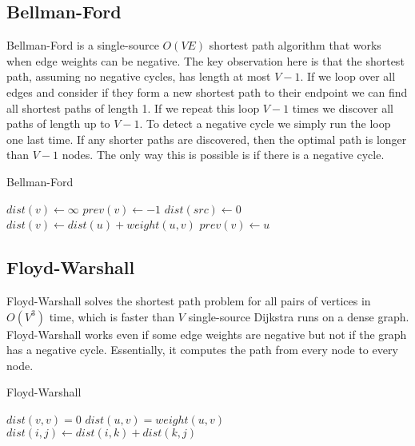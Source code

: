 \documentclass{article}
\begin{document}
\subsection{Bellman-Ford}

Bellman-Ford is a single-source $O(VE)$ shortest path algorithm that works when edge weights can be negative. The key observation here is that the shortest path, assuming no negative cycles, has length at most $V-1$.  If we loop over all edges and consider if they form a new shortest path to their endpoint we can find all shortest paths of length 1.  If we repeat this loop $V-1$ times we discover all paths of length up to $V-1$. To detect a negative cycle we simply run the loop one last time.  If any shorter paths are discovered, then the optimal path is longer than $V-1$ nodes.  The only way this is possible is if there is a negative cycle.

\begin{algorithm}[H]
\caption{Bellman-Ford}
\begin{algorithmic}
	\State $dist(v)\gets\infty$
    \State $prev(v)\gets -1$
\EndFor
\State $dist(src) \gets 0$
    	    \State $dist(v) \gets dist(u)+weight(u,v)$
	        \State $prev(v) \gets u$
        \EndIf
	\EndFor
\EndFor
{}
	\EndIf
\EndFor
\end{algorithmic}
\end{algorithm}

\subsection{Floyd-Warshall}
Floyd-Warshall solves the shortest path problem for all pairs of vertices in $O(V^3)$ time, which is faster than $V$ single-source Dijkstra runs on a dense graph. Floyd-Warshall works even if some edge weights are negative but not if the graph has a negative cycle. Essentially, it computes the path from every node to every node.

\begin{algorithm}[H]
\caption{Floyd-Warshall}
\begin{algorithmic}
	\State $dist(v,v)=0$
\EndFor
{}
	\State $dist(u,v)=weight(u,v)$
\EndFor
{}
            	\State $dist(i,j) \gets dist(i,k)+dist(k,j)$
            \EndIf
        \EndFor
    \EndFor
\EndFor
\end{algorithmic}
\end{algorithm}
\end{document}
